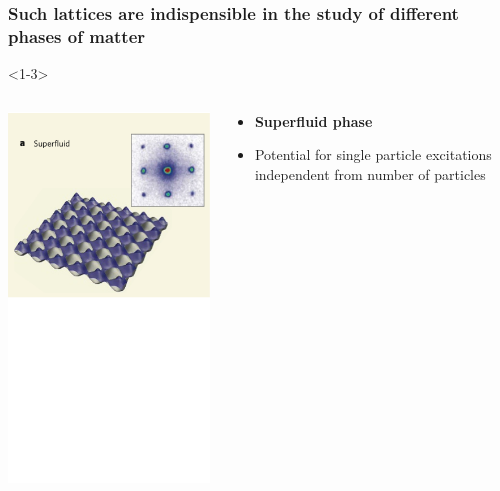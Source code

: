 \documentclass[aspectratio=169]{beamer}
\begin{document}
\begin{frame}
  \frametitle{Such lattices are indispensible in the study of different phases of matter}
  \begin{onlyenv}<1-3>
    \begin{columns}[T] %
      \begin{column}{.48\textwidth}
        \begin{center}
          \includegraphics[scale=0.2]{../img/SF.png}
        \end{center}
      \end{column}%
      \hfill%
      \begin{column}{.48\textwidth}
        \begin{itemize}
          \item<2-> \textbf{Superfluid phase}\footnotemark[1]
          \item<3-> Potential for single particle excitations independent from number of particles 
        \end{itemize}

\end{column}
\end{columns}
\end{onlyenv}
\end{frame}
\end{document}
